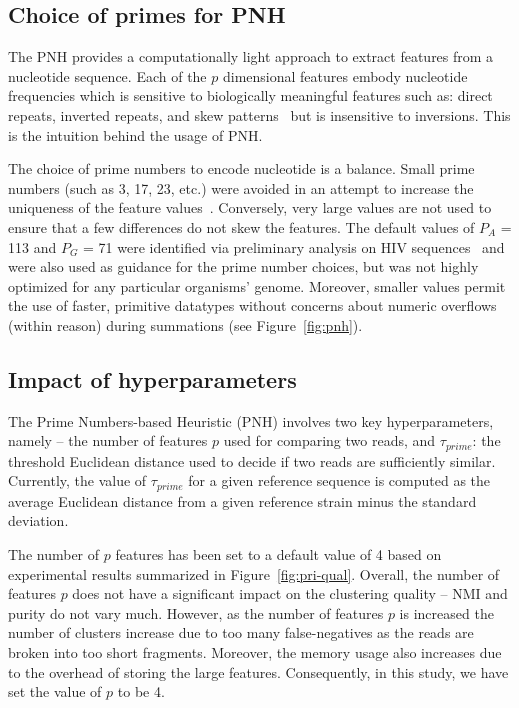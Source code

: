 \subsection{Choice of primes for PNH}

The PNH provides a computationally light approach to extract features
from a nucleotide sequence.  Each of the $p$ dimensional features
embody nucleotide frequencies which is sensitive to biologically
meaningful features such as: direct repeats, inverted repeats, and
skew patterns~\cite{hemert-18} but is insensitive to inversions.  This
is the intuition behind the usage of PNH.

The choice of prime numbers to encode nucleotide is a balance.  Small
prime numbers (such as 3, 17, 23, etc.) were avoided in an attempt to
increase the uniqueness of the feature values~\cite{ye-14}.
Conversely, very large values are not used to ensure that a few
differences do not skew the features.  The default values of $P_{A}$ =
113 and $P_{G}$ = 71 were identified via preliminary analysis on HIV
sequences~\cite{delgado-15} and were also used as guidance for the
prime number choices, but was not highly optimized for any particular
organisms' genome.  Moreover, smaller values permit the use of faster,
primitive datatypes without concerns about numeric overflows (within
reason) during summations (see Figure~\ref{fig:pnh}).

\subsection{Impact of hyperparameters}

The Prime Numbers-based Heuristic (PNH) involves two key
hyperparameters, namely --  the number of features $p$ used
for comparing two reads, and  $\tau_{prime}$: the threshold
Euclidean distance used to decide if two reads are sufficiently
similar.  Currently, the value of $\tau_{prime}$ for a given reference
sequence is computed as the average Euclidean distance from a given
reference strain minus the standard deviation.

The number of $p$ features has been set to a default value of 4 based
on experimental results summarized in
Figure~\ref{fig:pri-qual}. Overall, the number of features $p$ does
not have a significant impact on the clustering quality -- \ie\/ NMI
and purity do not vary much.  However, as the number of features $p$
is increased the number of clusters increase due to too many
false-negatives as the reads are broken into too short fragments.
Moreover, the memory usage also increases due to the overhead of
storing the large features.  Consequently, in this study, we have set
the value of $p$ to be 4.

